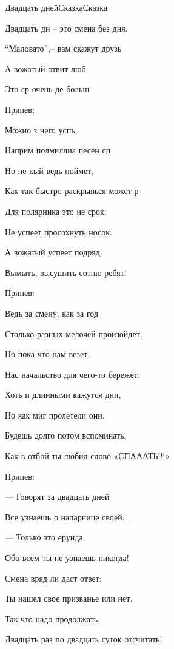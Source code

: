 \documentclass[11pt,a5paper]{book}
\begin{document}
\begin{song}{Двадцать дней}{}{Сказка}{Сказка}{}{}


Двадцать дн – это смена без дня.\par
“Маловато”,– вам скажут друзь\par
А вожатый отвит люб:\par
Это ср очень де больш\par
 
\begin{SBVerse*}
Припев:\par
Можно з него успь,\par
Наприм полмиллиа песен сп\par
Но не кый ведь поймет,\par
Как так быстро раскрывься может р\par
\end{SBVerse*}

Для полярника это не срок:\par
Не успеет просохнуть носок.\par
А вожатый успеет подряд \par
Вымыть, высушить сотню ребят!

\begin{SBChorus*}
Припев:\par
Ведь за смену, как за год \par
Столько разных мелочей произойдет,\par
Но пока что нам везет,\par
Нас начальство для чего-то бережёт.
 \end{SBChorus*}

\newpage
Хоть и длинными кажутся дни,\par
Но как миг пролетели они.\par
Будешь долго потом вспоминать,\par
Как в отбой ты любил слово «СПАААТЬ!!!»

\begin{SBChorus*}
Припев:\par
          	— Говорят за двадцать дней \par
          	Все узнаешь о напарнице своей…\par
          	— Только это ерунда,\par
          	Обо всем ты не узнаешь никогда!\\
 \end{SBChorus*}
Смена вряд ли даст ответ:\par
Ты нашел свое призванье или нет.\par
Так что надо продолжать,\par
Двадцать раз по двадцать суток отсчитать!\par


\end{song}
\end{document}
